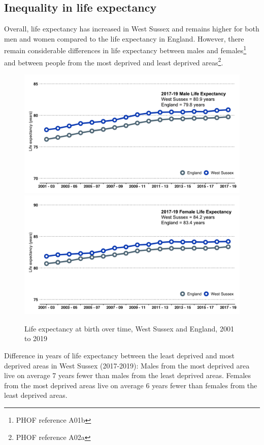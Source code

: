 \subsection{Inequality in life expectancy}

Overall, life expectancy has increased in West Sussex and remains higher for both men and women compared to the life expectancy in England. However, there remain considerable differences in life expectancy between males and females\footnote{PHOF reference A01b} and between people from the most deprived and least deprived areas\footnote{PHOF reference A02a}.

\begin{figure}[ht!]
    \caption{Life expectancy at birth over time, West Sussex and England, 2001 to 2019}
    \centering
	\includegraphics[width=\linewidth]{images/male_life_expectancy.png}
	\includegraphics[width=\linewidth]{images/female_life_expectancy.png}
	\label{fig:life_exp}
\end{figure}

Difference in years of life expectancy between the least deprived and most deprived areas in West Sussex (2017-2019): Males from the most deprived area live on average 7 years fewer than males from the least deprived areas. Females from the most deprived areas live on average 6 years fewer than females from the least deprived areas.


